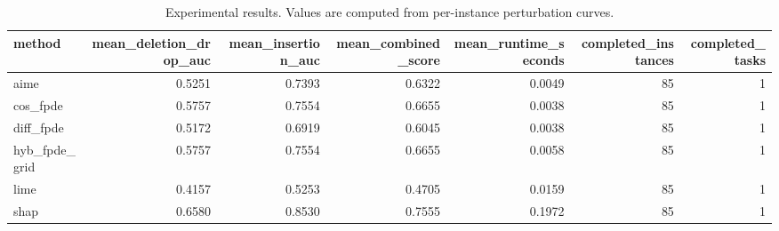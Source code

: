 \begin{table}[t]
\caption{Experimental results. Values are computed from per-instance perturbation curves.}
\label{tab:main_results_computed}
\centering
\begin{tabular}{lrrrrrr}
\toprule
method & mean\_deletion\_drop\_auc & mean\_insertion\_auc & mean\_combined\_score & mean\_runtime\_seconds & completed\_instances & completed\_tasks \\
\midrule
aime & 0.5251 & 0.7393 & 0.6322 & 0.0049 & 85 & 1 \\
cos\_fpde & 0.5757 & 0.7554 & 0.6655 & 0.0038 & 85 & 1 \\
diff\_fpde & 0.5172 & 0.6919 & 0.6045 & 0.0038 & 85 & 1 \\
hyb\_fpde\_grid & 0.5757 & 0.7554 & 0.6655 & 0.0058 & 85 & 1 \\
lime & 0.4157 & 0.5253 & 0.4705 & 0.0159 & 85 & 1 \\
shap & 0.6580 & 0.8530 & 0.7555 & 0.1972 & 85 & 1 \\
\bottomrule
\end{tabular}

\end{table}
